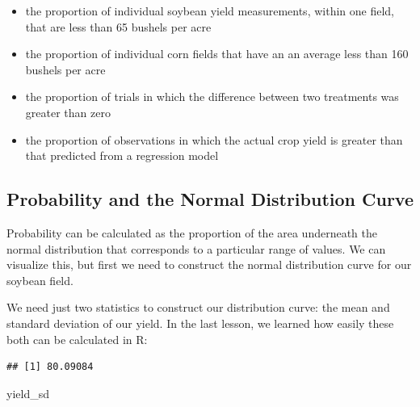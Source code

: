 \documentclass[
]{book}
\newenvironment{Shaded}{\begin{snugshade}}{\end{snugshade}}
\newcommand{\AttributeTok}[1]{\textcolor[rgb]{0.77,0.63,0.00}{#1}}
\newcommand{\CommentTok}[1]{\textcolor[rgb]{0.56,0.35,0.01}{\textit{#1}}}
\newcommand{\ConstantTok}[1]{\textcolor[rgb]{0.00,0.00,0.00}{#1}}
\newcommand{\FunctionTok}[1]{\textcolor[rgb]{0.00,0.00,0.00}{#1}}
\newcommand{\NormalTok}[1]{#1}
\newcommand{\OtherTok}[1]{\textcolor[rgb]{0.56,0.35,0.01}{#1}}
\newcommand{\SpecialCharTok}[1]{\textcolor[rgb]{0.00,0.00,0.00}{#1}}
\begin{document}
\begin{itemize}
\item
  the proportion of individual soybean yield measurements, within one field, that are less than 65 bushels per acre
\item
  the proportion of individual corn fields that have an an average less than 160 bushels per acre
\item
  the proportion of trials in which the difference between two treatments was greater than zero
\item
  the proportion of observations in which the actual crop yield is greater than that predicted from a regression model
\end{itemize}

\hypertarget{probability-and-the-normal-distribution-curve}{%
\subsection{Probability and the Normal Distribution Curve}\label{probability-and-the-normal-distribution-curve}}

Probability can be calculated as the proportion of the area underneath the normal distribution that corresponds to a particular range of values. We can visualize this, but first we need to construct the normal distribution curve for our soybean field.

We need just two statistics to construct our distribution curve: the mean and standard deviation of our yield. In the last lesson, we learned how easily these both can be calculated in R:

\begin{Shaded}
\end{Shaded}

\begin{verbatim}
## [1] 80.09084
\end{verbatim}

\begin{Shaded}
\begin{Highlighting}[]
\NormalTok{yield\_sd}
\end{Highlighting}
\end{Shaded}
\end{document}
